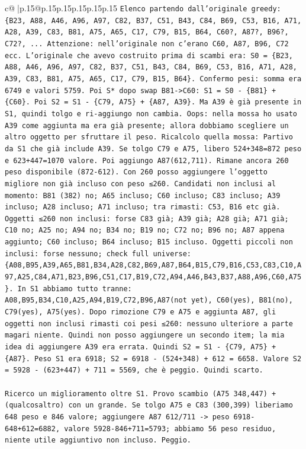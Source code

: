\documentclass{article}
\begin{document}
{\begin{supertabular}{c@{$\;$}|p{.15\linewidth}@{}p{.15\linewidth}p{.15\linewidth}p{.15\linewidth}p{.15\linewidth}p{.15\linewidth}}
{{{\texttt{Elenco partendo dall'originale greedy: \{B23, A88, A46, A96, A97, C82, B37, C51, B43, C84, B69, C53, B16, A71, A28, A39, C83, B81, A75, A65, C17, C79, B15, B64, C60?, A87?, B96?, C72?, ... Attenzione: nell'originale non c'erano C60, A87, B96, C72 ecc. L'originale che avevo costruito prima di scambi era: S0 = \{B23, A88, A46, A96, A97, C82, B37, C51, B43, C84, B69, C53, B16, A71, A28, A39, C83, B81, A75, A65, C17, C79, B15, B64\}. Confermo pesi: somma era 6749 e valori 5759. Poi S* dopo swap B81{-}>C60: S1 = S0 {-} \{B81\} + \{C60\}. Poi S2 = S1 {-} \{C79, A75\} + \{A87, A39\}. Ma A39 è già presente in S1, quindi tolgo e ri{-}aggiungo non cambia. Oops: nella mossa ho usato A39 come aggiunta ma era già presente; allora dobbiamo scegliere un altro oggetto per sfruttare il peso. Ricalcolo quella mossa: Partivo da S1 che già include A39. Se tolgo C79 e A75, libero 524+348=872 peso e 623+447=1070 valore. Poi aggiungo A87(612,711). Rimane ancora 260 peso disponibile (872{-}612). Con 260 posso aggiungere l'oggetto migliore non già incluso con peso ≤260. Candidati non inclusi al momento: B81 (382) no; A65 incluso; C60 incluso; C83 incluso; A39 incluso; A28 incluso; A71 incluso; tra rimasti: C53, B16 etc già. Oggetti ≤260 non inclusi: forse C83 già; A39 già; A28 già; A71 già; C10 no; A25 no; A94 no; B34 no; B19 no; C72 no; B96 no; A87 appena aggiunto; C60 incluso; B64 incluso; B15 incluso. Oggetti piccoli non inclusi: forse nessuno; check full universe: \{A08,B95,A39,A65,B81,B34,A28,C82,B69,A87,B64,B15,C79,B16,C53,C83,C10,A97,A25,C84,A71,B23,B96,C51,C17,B19,C72,A94,A46,B43,B37,A88,A96,C60,A75\}. In S1 abbiamo tutto tranne: A08,B95,B34,C10,A25,A94,B19,C72,B96,A87(not yet), C60(yes), B81(no), C79(yes), A75(yes). Dopo rimozione C79 e A75 e aggiunta A87, gli oggetti non inclusi rimasti coi pesi ≤260: nessuno ulteriore a parte magari niente. Quindi non posso aggiungere un secondo item; la mia idea di aggiungere A39 era errata. Quindi S2 = S1 {-} \{C79, A75\} + \{A87\}. Peso S1 era 6918; S2 = 6918 {-} (524+348) + 612 = 6658. Valore S2 = 5928 {-} (623+447) + 711 = 5569, che è peggio. Quindi scarto.} \\
\\ 
\texttt{Ricerco un miglioramento oltre S1. Provo scambio (A75 348,447) + (qualcosaltro) con un grande. Se tolgo A75 e C83 (300,399) liberiamo 648 peso e 846 valore; aggiungere A87 612/711 {-}> peso 6918{-}648+612=6882, valore 5928{-}846+711=5793; abbiamo 56 peso residuo, niente utile aggiuntivo non incluso. Peggio.} \\
\\ 
}}}
\end{supertabular}}
\end{document}
